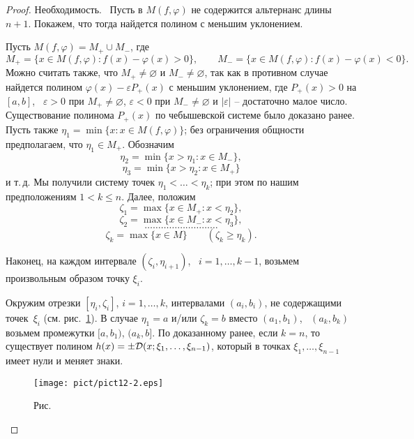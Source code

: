 \begin{proof}
Н\;е\;о\;б\;х\;о\;д\;и\;м\;о\;с\;т\;ь.~ Пусть в $M(f,\varphi)$ не
содержится альтернанс длины $n+1$. Покажем, что тогда найдется полином с
меньшим уклонением.

Пусть $M(f,\varphi) = M_+\cup M_-$, где
$$
M_+=\{x\in M(f,\varphi)\colon f(x)-\varphi(x)>0\},\qquad
M_-=\{x\in M(f,\varphi)\colon f(x)-\varphi(x)<0\}.
$$
{Можно считать также,
что $M_+\ne \varnothing$ и $M_-\ne \varnothing$, так как в противном случае найдется}
{полином $\varphi(x)-\varepsilon P_+(x)$ с меньшим уклонением, где
$P_+(x)>0$ на $[a,b]$,~ $\varepsilon>0$ при} {$M_+\ne \varnothing$,
$\varepsilon<0$ при $M_-\ne \varnothing$ и $|\varepsilon|$ -- достаточно
малое число. Существование полинома} {$P_+(x)$ по чебышевской системе было
доказано ранее.} Пусть также $\eta_1=\min\{x\colon x\in M(f,\varphi)\}$;
без ограничения общности предполагаем, что $\eta_1\in M_+$. Обозначим
$$ \eta_2 = \min\{x>\eta_1\colon x\in M_-\}, $$
$$ \eta_3 = \min\{x>\eta_2\colon x\in M_+\} $$
и т.\,д. Мы получили систему точек $\eta_1<\ldots<\eta_k$; при этом по
{нашим предположениям} {$1<k\le n$}. Далее, положим
$$ \zeta_1 = \max\{x\in M_+\colon x<\eta_2\}, $$
$$ \zeta_2 = \max\{x\in M_-\colon x<\eta_3\}, $$
$$ {\ldots\ldots\ldots\ldots\ldots\ldots\ldots\ldots\ldots} $$
$$ {\zeta_k = \max\{x\in M\} \qquad (\zeta_k\ge\eta_k).} $$


Наконец, на каждом интервале $(\zeta_i,\eta_{i+1})$,~ $i=1,\ldots,k-1$,
возьмем произвольным образом точку $\xi_i$.

Окружим отрезки $[\eta_i,\zeta_i]$, {$i=1,\ldots,k$}, интервалами {$(a_i,b_i)$},
не содержащими точек~$\xi_i$ (см. рис.~\ref{r12-2}). В случае $\eta_1=a$
и/или $\zeta_k=b$ вместо $(a_1,b_1)$,~ $(a_k,b_k)$ возьмем промежутки $[a,b_1)$,
$(a_k,b]$. По доказанному ранее, если $k=n$, то существует
полином $h(x)=\pm{\cal D}(x;\xi_1,\ldots,\xi_{n-1})$,
который в точках $\xi_1,\ldots,\xi_{n-1}$ имеет нули и меняет знаки.

 \bigskip
\begin{figure}[ht]
\begin{center}
\texttt{[image: pict/pict12-2.eps]}
\end{center}
 \bigskip
 \label{r12-2}

 \centerline{Рис.~\theris}
 \bigskip
\end{figure}



\end{proof}
